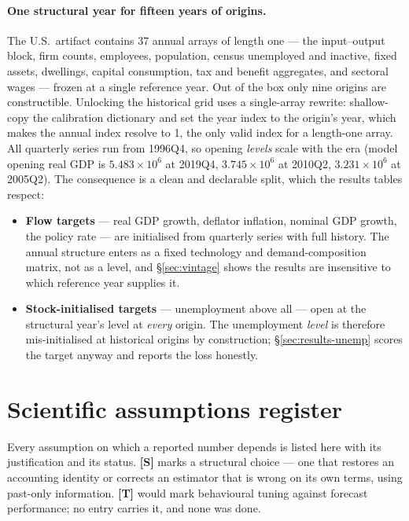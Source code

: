 \documentclass[11pt,a4paper]{article}
\begin{document}
\paragraph{One structural year for fifteen years of origins.} The U.S.\ artifact contains 37 annual
arrays of length one --- the input--output block, firm counts, employees, population, census
unemployed and inactive, fixed assets, dwellings, capital consumption, tax and benefit aggregates,
and sectoral wages --- frozen at a single reference year. Out of the box only nine origins are
constructible. Unlocking the historical grid uses a single-array rewrite: shallow-copy the
calibration dictionary and set the year index to the origin's year, which makes the annual index
resolve to 1, the only valid index for a length-one array. All quarterly series run from 1996Q4,
so opening \emph{levels} scale with the era (model opening real GDP is $5.483\times10^{6}$ at
2019Q4, $3.745\times10^{6}$ at 2010Q2, $3.231\times10^{6}$ at 2005Q2). The consequence is a clean
and declarable split, which the results tables respect:

\begin{itemize}[leftmargin=1.4em,itemsep=1pt]
\item \textbf{Flow targets} --- real GDP growth, deflator inflation, nominal GDP growth, the policy
  rate --- are initialised from quarterly series with full history. The annual structure enters as
  a fixed technology and demand-composition matrix, not as a level, and \S\ref{sec:vintage} shows
  the results are insensitive to which reference year supplies it.
\item \textbf{Stock-initialised targets} --- unemployment above all --- open at the structural
  year's level at \emph{every} origin. The unemployment \emph{level} is therefore mis-initialised
  at historical origins by construction; \S\ref{sec:results-unemp} scores the target anyway and
  reports the loss honestly.
\end{itemize}

\section{Scientific assumptions register}
\label{sec:assumptions}

Every assumption on which a reported number depends is listed here with its justification and its
status. \textbf{[S]} marks a structural choice --- one that restores an accounting identity or
corrects an estimator that is wrong on its own terms, using past-only information. \textbf{[T]}
would mark behavioural tuning against forecast performance; no entry carries it, and none was done.
\end{document}
